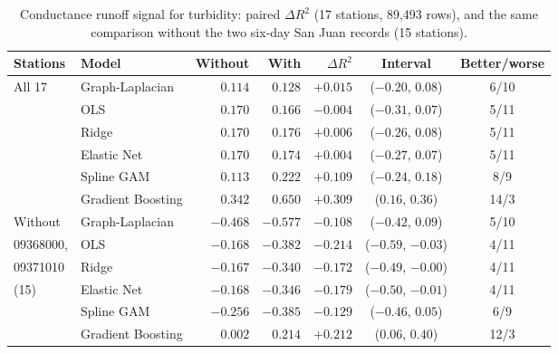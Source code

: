 \documentclass[11pt]{article}
\begin{document}
\begin{table}[h]
\centering
\small
\caption{Conductance runoff signal for turbidity: paired $\Delta R^2$ (17 stations, 89{,}493
rows), and the same comparison without the two six-day San Juan records (15 stations).}
\label{tab:runoff}
\begin{tabular}{ll rrrcc}
\toprule
Stations & Model & Without & With & $\Delta R^2$ & Interval & Better/worse \\
\midrule
All 17        & Graph-Laplacian   & $0.114$ & $0.128$ & $+0.015$ & ($-0.20$, $0.08$) & 6/10 \\
              & OLS               & $0.170$ & $0.166$ & $-0.004$ & ($-0.31$, $0.07$) & 5/11 \\
              & Ridge             & $0.170$ & $0.176$ & $+0.006$ & ($-0.26$, $0.08$) & 5/11 \\
              & Elastic Net       & $0.170$ & $0.174$ & $+0.004$ & ($-0.27$, $0.07$) & 5/11 \\
              & Spline GAM        & $0.113$ & $0.222$ & $+0.109$ & ($-0.24$, $0.18$) & 8/9 \\
              & Gradient Boosting & $0.342$ & $0.650$ & $\mathbf{+0.309}$ & ($0.16$, $0.36$) & 14/3 \\
\addlinespace
Without       & Graph-Laplacian   & $-0.468$ & $-0.577$ & $-0.108$ & ($-0.42$, $0.09$) & 5/10 \\
09368000,     & OLS               & $-0.168$ & $-0.382$ & $\mathbf{-0.214}$ & ($-0.59$, $-0.03$) & 4/11 \\
09371010      & Ridge             & $-0.167$ & $-0.340$ & $\mathbf{-0.172}$ & ($-0.49$, $-0.00$) & 4/11 \\
(15)          & Elastic Net       & $-0.168$ & $-0.346$ & $\mathbf{-0.179}$ & ($-0.50$, $-0.01$) & 4/11 \\
              & Spline GAM        & $-0.256$ & $-0.385$ & $-0.129$ & ($-0.46$, $0.05$) & 6/9 \\
              & Gradient Boosting & $0.002$ & $0.214$ & $\mathbf{+0.212}$ & ($0.06$, $0.40$) & 12/3 \\
\bottomrule
\end{tabular}
\end{table}
\end{document}

